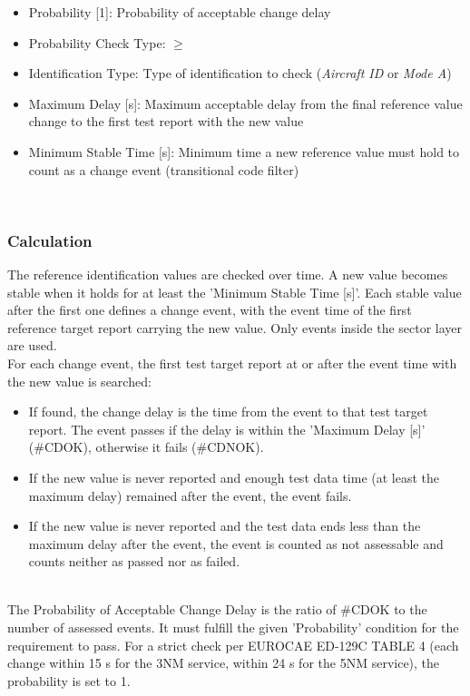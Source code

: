 \begin{itemize}
\item Probability [1]: Probability of acceptable change delay
\item Probability Check Type: $\geq$
\item Identification Type: Type of identification to check (\textit{Aircraft ID} or \textit{Mode A})
\item Maximum Delay [s]: Maximum acceptable delay from the final reference value change to the first test report with the new value
\item Minimum Stable Time [s]: Minimum time a new reference value must hold to count as a change event (transitional code filter)
\end{itemize}
\ \\

\subsubsection{Calculation}

The reference identification values are checked over time. A new value becomes stable when it holds for at least the 'Minimum Stable Time [s]'. Each stable value after the first one defines a change event, with the event time of the first reference target report carrying the new value. Only events inside the sector layer are used. \\

For each change event, the first test target report at or after the event time with the new value is searched:
\begin{itemize}
\item If found, the change delay is the time from the event to that test target report. The event passes if the delay is within the 'Maximum Delay [s]' (\#CDOK), otherwise it fails (\#CDNOK).
\item If the new value is never reported and enough test data time (at least the maximum delay) remained after the event, the event fails.
\item If the new value is never reported and the test data ends less than the maximum delay after the event, the event is counted as not assessable and counts neither as passed nor as failed.
\end{itemize}
\ \\

The Probability of Acceptable Change Delay is the ratio of \#CDOK to the number of assessed events. It must fulfill the given 'Probability' condition for the requirement to pass. For a strict check per EUROCAE ED-129C TABLE 4 (each change within 15 s for the 3NM service, within 24 s for the 5NM service), the probability is set to 1. \\

